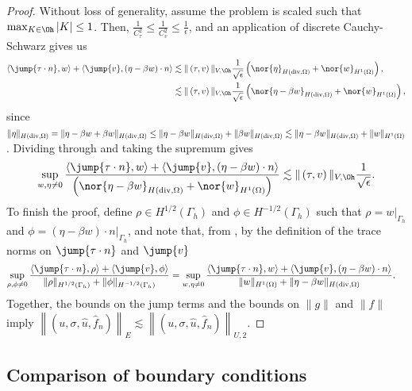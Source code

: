 \begin{proof}
Without loss of generality, assume the problem is scaled such that $\max_{K\in\Oh}|K| \leq 1$. Then, $\frac{1}{C_\tau^2}\leq \frac{1}{C_v^2} \leq \frac{1}{\epsilon}$, and an application of discrete Cauchy-Schwarz gives us 
\begin{align*}
\langle \jump{\tau\cdot n},w\rangle + \langle \jump{v},\left(\eta - \beta w\right)\cdot n\rangle &\lesssim \|\left(\tau,v\right)\|_{V,\Oh}\frac{1}{\sqrt{\epsilon}}\left(\nor{\eta}_{H({\rm div},\Omega)} + \nor{w}_{H^1(\Omega)}\right),\\
&\lesssim \|\left(\tau,v\right)\|_{V,\Oh}\frac{1}{\sqrt{\epsilon}}\left(\nor{\eta-\beta w}_{H({\rm div},\Omega)} + \nor{w}_{H^1(\Omega)}\right),
\end{align*}
since $\|\eta\|_{H({\rm div},\Omega)} = \|\eta - \beta w + \beta w\|_{H({\rm div},\Omega)} \leq \|\eta - \beta w\|_{H({\rm div},\Omega)} + \|\beta w\|_{H({\rm div},\Omega)} \lesssim \|\eta-\beta w\|_{H({\rm div},\Omega)} + \|w\|_{H^1(\Omega)}$.  Dividing through and taking the supremum gives
\[
\sup_{w,\eta \neq 0} \frac{\langle\jump{\tau\cdot n},w\rangle + \langle \jump{v},\left(\eta - \beta w\right)\cdot n\rangle}{\left(\nor{\eta-\beta w}_{H({\rm div},\Omega)} + \nor{w}_{H^1(\Omega)}\right)} \lesssim \|\left(\tau,v\right)\|_{V,\Oh}\frac{1}{\sqrt{\epsilon}}.
\]
To finish the proof, define $\rho \in H^{1/2}(\Gamma_h)$ and $\phi \in H^{-1/2}(\Gamma_h)$ such that $\rho = \left.w\right|_{\Gamma_h}$ and $\phi = \left.(\eta-\beta w)\cdot n\right|_{\Gamma_h}$, and note that, from \cite{analysisDPG}, by the definition of the trace norms on $\jump{\tau\cdot n}$ and $\jump{v}$ 
\begin{align*}
\sup_{\rho,\phi \neq 0} \frac{\langle \jump{\tau\cdot n},\rho\rangle + \langle \jump{v},\phi \rangle}{\|\rho\|_{H^{1/2}(\Gamma_h)}+\|\phi\|_{H^{-1/2}(\Gamma_h)}} &= \sup_{w,\eta \neq 0} \frac{\langle \jump{\tau\cdot n},w\rangle + \langle \jump{v},\left(\eta - \beta w\right)\cdot n\rangle}{ \|w\|_{H^1(\Omega)}+\|\eta-\beta w\|_{H({\rm div},\Omega)}}.
\end{align*}
Together, the bounds on the jump terms and the bounds on $\|g\|$ and $\|f\|$ imply $\left\|\left(u,\sigma,\widehat{u},\widehat{f}_n\right)\right\|_{E} \lesssim \left\|\left(u,\sigma,\widehat{u},\widehat{f}_n\right)\right\|_{U,2}$.
\end{proof}

\subsection{Comparison of boundary conditions}

